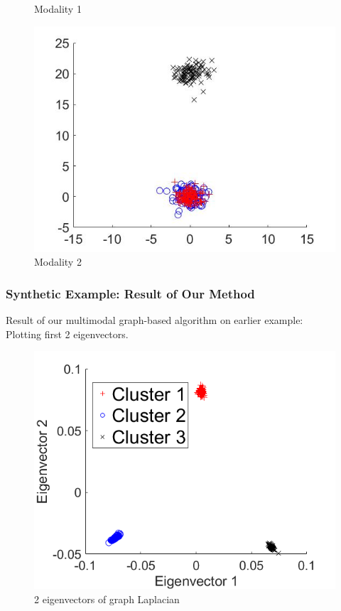 \documentclass{beamer}
\begin{document}
\begin{frame}
\begin{figure}[ht]
\begin{minipage}[b]{0.3\linewidth}
      \caption{Modality 1}
    \end{minipage}
    \begin{minipage}[b]{0.3\linewidth}
      \centering
      \includegraphics[width=\textwidth]{./Images/Synthetic/set2.jpg}
      \caption{Modality 2}
    \end{minipage}
    \label{fig:SynthData}
  \end{figure}
\end{frame}


\begin{frame}
  \frametitle{Synthetic Example: Result of Our Method}
  Result of our multimodal graph-based algorithm on earlier example: \\
  Plotting first 2 eigenvectors.
  \begin{figure}
    \centering
    \includegraphics[width=0.5\linewidth]{./Images/Synthetic/clustersGraph.png}
    \caption{2 eigenvectors of graph Laplacian}
  \end{figure}
\end{frame}
\end{document}
